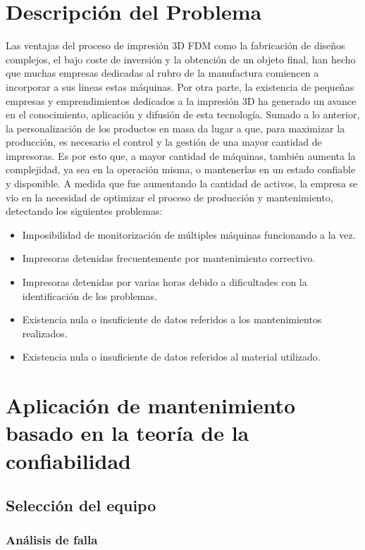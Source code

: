\section{Descripción del Problema}

Las ventajas del proceso de impresión 3D FDM como la fabricación de diseños complejos, el bajo coste de inversión y la obtención de un objeto final, han hecho que muchas empresas dedicadas al rubro de la manufactura comiencen a incorporar a sus lineas estas máquinas. Por otra parte, la existencia de pequeñas empresas y emprendimientos dedicados a la impresión 3D ha generado un avance en el conocimiento, aplicación y difusión de esta tecnología. Sumado a lo anterior, la personalización de los productos en masa da lugar a que, para maximizar la producción, es necesario el control y la gestión de una mayor cantidad de impresoras. Es por esto que, a mayor cantidad de máquinas, también aumenta la complejidad, ya sea en la operación misma, o mantenerlas en un estado confiable y disponible. A medida que fue aumentando la cantidad de activos, la empresa se vio en la necesidad de optimizar el proceso de producción y mantenimiento, detectando los siguientes problemas:

\begin{itemize}
\item Imposibilidad de monitorización de múltiples máquinas funcionando a la vez.
\item Impresoras detenidas frecuentemente por mantenimiento correctivo.
\item Impresoras detenidas por varias horas debido a dificultades con la identificación de los problemas.
\item Existencia nula o insuficiente de datos referidos a los mantenimientos realizados.
\item Existencia nula o insuficiente de datos referidos al material utilizado.
\end{itemize}





\section{ Aplicación de mantenimiento basado en la teoría de la confiabilidad}


\subsection{Selección del equipo}
\subsubsection{Análisis de falla}

